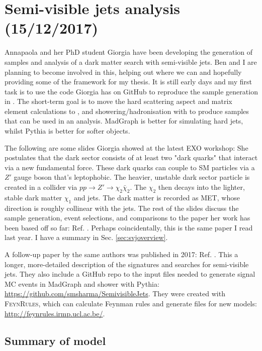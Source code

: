 \newpage
\chapter{Semi-visible jets analysis (15/12/2017)}

Annapaola and her PhD student Giorgia have been developing the generation of samples and analysis of a dark matter search with semi-visible jets. Ben and I are planning to become involved in this, helping out where we can and hopefully providing some of the framework for my thesis. It is still early days and my first task is to use the code Giorgia has on GitHub to reproduce the sample generation in \PYTHIA. The short-term goal is to move the hard scattering aspect and matrix element calculations to \madgraph, and showering/hadronisation with \PYTHIA to produce samples that can be used in an analysis. MadGraph is better for simulating hard jets, whilst Pythia is better for softer objects.

The following are some slides Giorgia showed at the latest EXO workshop: %
She postulates that the dark sector consists of at least two "dark quarks" that interact via a new fundamental force. These dark quarks can couple to SM particles via a $Z'$ gauge boson that's leptophobic. The heavier, unstable dark sector particle is created in a collider via $pp \rightarrow Z' \rightarrow \chi_2 \bar{\chi}_2$. The $\chi_2$ then decays into the lighter, stable dark matter $\chi_1$ and jets. The dark matter is recorded as MET, whose direction is roughly collinear with the jets. The rest of the slides discuss the sample generation, event selections, and comparisons to the paper her work has been based off so far: Ref. \cite{Cohen:2015toa}. Perhaps coincidentally, this is the same paper I read last year. I have a summary in Sec. \ref{sec:svjoverview}.

A follow-up paper by the same authors was published in 2017: Ref. \cite{Cohen:2017pzm}. This a longer, more-detailed description of the signatures and searches for semi-visible jets. They also include a GitHub repo to the input files needed to generate signal MC events in MadGraph and shower with Pythia: \url{https://github.com/smsharma/SemivisibleJets}. They were created with \textsc{FeynRules}, which can calculate Feynman rules and generate files for new models: \url{http://feynrules.irmp.ucl.ac.be/}.


\section{Summary of model}

